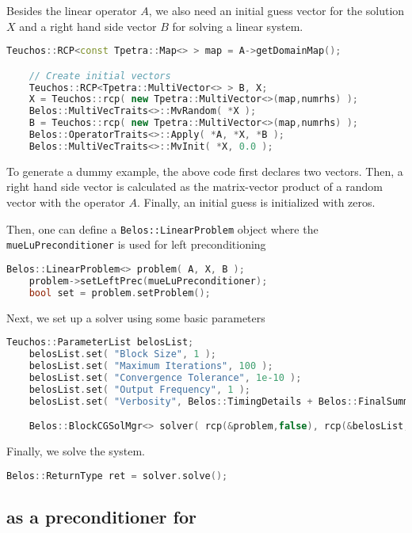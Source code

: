 Besides the linear operator $A$, we also need an initial guess vector for the
solution $X$ and a right hand side vector $B$ for solving a linear system.
\begin{lstlisting}[language=C++]
    Teuchos::RCP<const Tpetra::Map<> > map = A->getDomainMap();

    // Create initial vectors
    Teuchos::RCP<Tpetra::MultiVector<> > B, X;
    X = Teuchos::rcp( new Tpetra::MultiVector<>(map,numrhs) );
    Belos::MultiVecTraits<>::MvRandom( *X );
    B = Teuchos::rcp( new Tpetra::MultiVector<>(map,numrhs) );
    Belos::OperatorTraits<>::Apply( *A, *X, *B );
    Belos::MultiVecTraits<>::MvInit( *X, 0.0 );
\end{lstlisting}
To generate a dummy example, the above code first declares two vectors. Then, a
right hand side vector is calculated as the matrix-vector product of a random vector
with the operator $A$. Finally, an initial guess is initialized with zeros.

Then, one can define a \texttt{Belos::LinearProblem} object where the
\texttt{mueLuPreconditioner} is used for left preconditioning
\begin{lstlisting}[language=C++]
    Belos::LinearProblem<> problem( A, X, B );
    problem->setLeftPrec(mueLuPreconditioner);
    bool set = problem.setProblem();
\end{lstlisting}

Next, we set up a \belos{} solver using some basic parameters
\begin{lstlisting}[language=C++]
    Teuchos::ParameterList belosList;
    belosList.set( "Block Size", 1 );
    belosList.set( "Maximum Iterations", 100 );
    belosList.set( "Convergence Tolerance", 1e-10 );
    belosList.set( "Output Frequency", 1 );
    belosList.set( "Verbosity", Belos::TimingDetails + Belos::FinalSummary );

    Belos::BlockCGSolMgr<> solver( rcp(&problem,false), rcp(&belosList,false) );
\end{lstlisting}

Finally, we solve the system.
\begin{lstlisting}[language=C++]
    Belos::ReturnType ret = solver.solve();
\end{lstlisting}

\subsection{\muelu{} as a preconditioner for \aztecoo}

